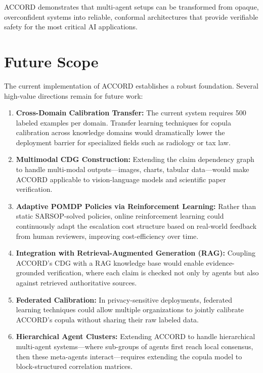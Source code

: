 \documentclass[12pt,a4paper]{report}
\begin{document}
ACCORD demonstrates that multi-agent setups can be transformed from opaque, overconfident systems into reliable, conformal architectures that provide verifiable safety for the most critical AI applications.

\section{Future Scope}

The current implementation of ACCORD establishes a robust foundation. Several high-value directions remain for future work:

\begin{enumerate}
    \item \textbf{Cross-Domain Calibration Transfer:} The current system requires 500 labeled examples per domain. Transfer learning techniques for copula calibration across knowledge domains would dramatically lower the deployment barrier for specialized fields such as radiology or tax law.

    \item \textbf{Multimodal CDG Construction:} Extending the claim dependency graph to handle multi-modal outputs---images, charts, tabular data---would make ACCORD applicable to vision-language models and scientific paper verification.

    \item \textbf{Adaptive POMDP Policies via Reinforcement Learning:} Rather than static SARSOP-solved policies, online reinforcement learning could continuously adapt the escalation cost structure based on real-world feedback from human reviewers, improving cost-efficiency over time.

    \item \textbf{Integration with Retrieval-Augmented Generation (RAG):} Coupling ACCORD's CDG with a RAG knowledge base would enable evidence-grounded verification, where each claim is checked not only by agents but also against retrieved authoritative sources.

    \item \textbf{Federated Calibration:} In privacy-sensitive deployments, federated learning techniques could allow multiple organizations to jointly calibrate ACCORD's copula without sharing their raw labeled data.

    \item \textbf{Hierarchical Agent Clusters:} Extending ACCORD to handle hierarchical multi-agent systems---where sub-groups of agents first reach local consensus, then these meta-agents interact---requires extending the copula model to block-structured correlation matrices.
\end{enumerate}
\end{document}
